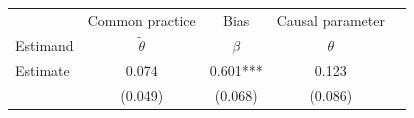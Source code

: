 
\begin{tabular}{l|cccc}
\toprule
& Common practice & Bias & Causal parameter \\
Estimand & $\widetilde{\theta}$ & $\beta$ & $\theta$\\
\midrule
Estimate & 0.074 & 0.601*** & 0.123\\
 & (0.049) & (0.068) & (0.086)\\
\bottomrule
\end{tabular}
